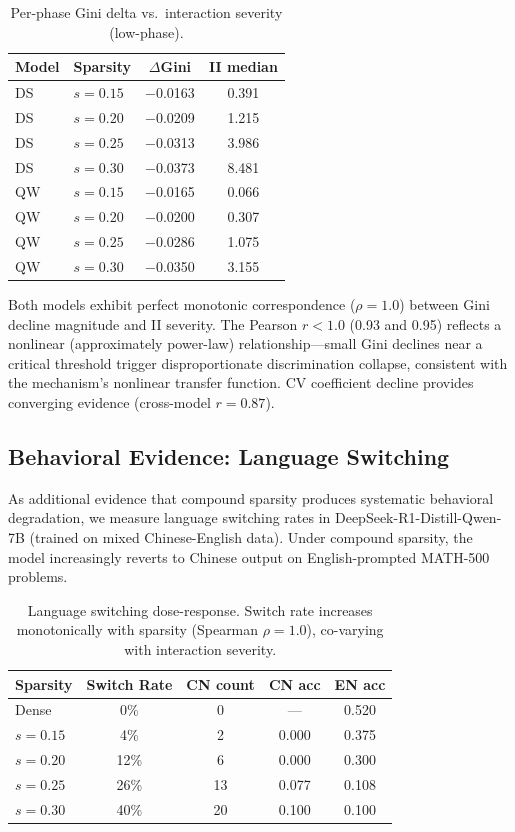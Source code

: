 \documentclass[11pt,a4paper]{article}
\begin{document}
\begin{table}[t]
\centering
\small
\caption{Per-phase Gini delta vs.\ interaction severity (low-phase).}
\label{tab:gini_detail}
\begin{tabular}{llcc}
\toprule
Model & Sparsity & $\Delta$Gini & II median \\
\midrule
DS & $s=0.15$ & $-$0.0163 & 0.391 \\
DS & $s=0.20$ & $-$0.0209 & 1.215 \\
DS & $s=0.25$ & $-$0.0313 & 3.986 \\
DS & $s=0.30$ & $-$0.0373 & 8.481 \\
\midrule
QW & $s=0.15$ & $-$0.0165 & 0.066 \\
QW & $s=0.20$ & $-$0.0200 & 0.307 \\
QW & $s=0.25$ & $-$0.0286 & 1.075 \\
QW & $s=0.30$ & $-$0.0350 & 3.155 \\
\bottomrule
\end{tabular}
\end{table}

Both models exhibit perfect monotonic correspondence ($\rho=1.0$) between Gini decline magnitude and II severity. The Pearson $r < 1.0$ (0.93 and 0.95) reflects a nonlinear (approximately power-law) relationship---small Gini declines near a critical threshold trigger disproportionate discrimination collapse, consistent with the mechanism's nonlinear transfer function. CV coefficient decline provides converging evidence (cross-model $r=0.87$).

\subsection{Behavioral Evidence: Language Switching}
\label{sec:langsw}

As additional evidence that compound sparsity produces systematic behavioral degradation, we measure language switching rates in DeepSeek-R1-Distill-Qwen-7B (trained on mixed Chinese-English data). Under compound sparsity, the model increasingly reverts to Chinese output on English-prompted MATH-500 problems.

\begin{table}[t]
\centering
\small
\caption{Language switching dose-response. Switch rate increases monotonically with sparsity (Spearman $\rho=1.0$), co-varying with interaction severity.}
\label{tab:langsw}
\begin{tabular}{lcccc}
\toprule
Sparsity & Switch Rate & CN count & CN acc & EN acc \\
\midrule
Dense & 0\% & 0 & --- & 0.520 \\
$s=0.15$ & 4\% & 2 & 0.000 & 0.375 \\
$s=0.20$ & 12\% & 6 & 0.000 & 0.300 \\
$s=0.25$ & 26\% & 13 & 0.077 & 0.108 \\
$s=0.30$ & 40\% & 20 & 0.100 & 0.100 \\
\bottomrule
\end{tabular}
\end{table}
\end{document}
